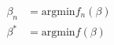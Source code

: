 \documentclass[preview]{standalone}
\begin{document}
\begin{center}
\begin{align*}
\beta_n &= \text{argmin} f_n(\beta) \\ 
\beta^* &= \text{argmin} f(\beta)
\end{align*}
\end{center}
\end{document}
